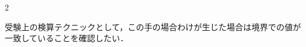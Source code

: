 \documentclass[../../../../main.tex]{subfiles}
\begin{document}
\begin{multicols}{2}
  \vspace{10pt}

  受験上の検算テクニックとして，この手の場合わけが生じた場合は境界での値が一致していることを確認したい．



  \newpage
\end{multicols}
\end{document}
